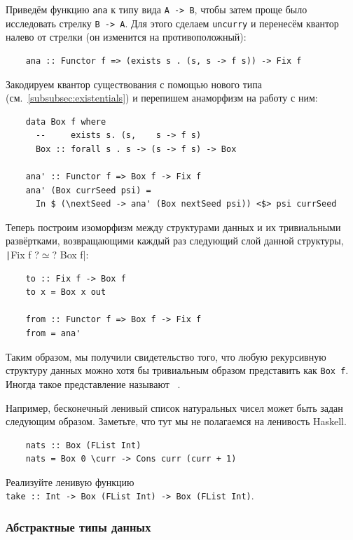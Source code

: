 Приведём функцию \texttt{ana} к типу вида \texttt{A -> B}, чтобы затем проще было исследовать стрелку \texttt{B -> A}.
Для этого сделаем \texttt{uncurry} и перенесём квантор налево от стрелки (он изменится на противоположный):
\begin{verbatim}
    ana :: Functor f => (exists s . (s, s -> f s)) -> Fix f
\end{verbatim}
Закодируем квантор существования с помощью нового типа (см.~\ref{subsubsec:existentials}) и перепишем анаморфизм на работу с ним:
\begin{verbatim}
    data Box f where
      --     exists s. (s,    s -> f s)
      Box :: forall s . s -> (s -> f s) -> Box

    ana' :: Functor f => Box f -> Fix f
    ana' (Box currSeed psi) =
      In $ (\nextSeed -> ana' (Box nextSeed psi)) <$> psi currSeed
\end{verbatim}
Теперь построим изоморфизм между структурами данных и их тривиальными развёртками, возвращающими каждый раз следующий слой данной структуры, \texttt|Fix f ?$\simeq$? Box f|:
\begin{verbatim}
    to :: Fix f -> Box f
    to x = Box x out

    from :: Functor f => Box f -> Fix f
    from = ana'
\end{verbatim}
Таким образом, мы получили свидетельство того, что любую рекурсивную структуру данных можно хотя бы тривиальным образом представить как \texttt{Box f}.
Иногда такое представление называют ~\cite{gibbons2008unfolding}.

Например, бесконечный ленивый список натуральных чисел может быть задан следующим образом.
Заметьте, что тут мы не полагаемся на ленивость Haskell.
\begin{verbatim}
    nats :: Box (FList Int)
    nats = Box 0 \curr -> Cons curr (curr + 1)
\end{verbatim}

\begin{task}
    Реализуйте ленивую функцию \\ \texttt{take :: Int -> Box (FList Int) -> Box (FList Int)}.
\end{task}

\subsubsection{Абстрактные типы данных} \label{subsubsec:abstract-data-types}

